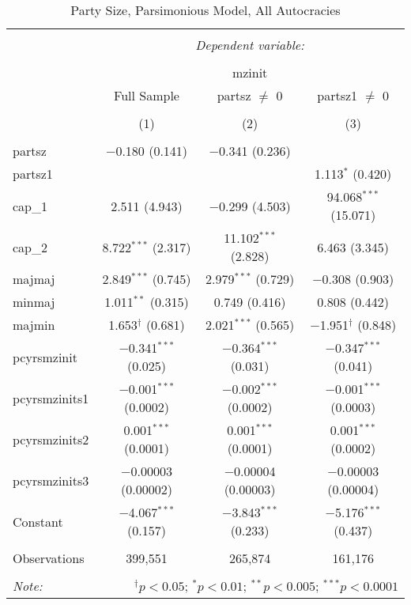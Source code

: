 
\begin{table}[!htbp] \centering 
  \caption{Party Size, Parsimonious Model, All Autocracies} 
  \label{} 
\begin{tabular}{@{\extracolsep{5pt}}lccc} 
\\[-1.8ex]\hline 
\hline \\[-1.8ex] 
 & \multicolumn{3}{c}{\textit{Dependent variable:}} \\ 
\cline{2-4} 
\\[-1.8ex] & \multicolumn{3}{c}{mzinit} \\ 
 & Full Sample & partsz $\neq$ 0 & partsz1 $\neq$ 0 \\ 
\\[-1.8ex] & (1) & (2) & (3)\\ 
\hline \\[-1.8ex] 
 partsz & $-$0.180 (0.141) & $-$0.341 (0.236) &  \\ 
  partsz1 &  &  & 1.113$^{*}$ (0.420) \\ 
  cap\_1 & 2.511 (4.943) & $-$0.299 (4.503) & 94.068$^{***}$ (15.071) \\ 
  cap\_2 & 8.722$^{***}$ (2.317) & 11.102$^{***}$ (2.828) & 6.463 (3.345) \\ 
  majmaj & 2.849$^{***}$ (0.745) & 2.979$^{***}$ (0.729) & $-$0.308 (0.903) \\ 
  minmaj & 1.011$^{**}$ (0.315) & 0.749 (0.416) & 0.808 (0.442) \\ 
  majmin & 1.653$^{\dagger}$ (0.681) & 2.021$^{***}$ (0.565) & $-$1.951$^{\dagger}$ (0.848) \\ 
  pcyrsmzinit & $-$0.341$^{***}$ (0.025) & $-$0.364$^{***}$ (0.031) & $-$0.347$^{***}$ (0.041) \\ 
  pcyrsmzinits1 & $-$0.001$^{***}$ (0.0002) & $-$0.002$^{***}$ (0.0002) & $-$0.001$^{***}$ (0.0003) \\ 
  pcyrsmzinits2 & 0.001$^{***}$ (0.0001) & 0.001$^{***}$ (0.0001) & 0.001$^{***}$ (0.0002) \\ 
  pcyrsmzinits3 & $-$0.00003 (0.00002) & $-$0.00004 (0.00003) & $-$0.00003 (0.00004) \\ 
  Constant & $-$4.067$^{***}$ (0.157) & $-$3.843$^{***}$ (0.233) & $-$5.176$^{***}$ (0.437) \\ 
 \hline \\[-1.8ex] 
Observations & 399,551 & 265,874 & 161,176 \\ 
\hline 
\hline \\[-1.8ex] 
\textit{Note:}  & \multicolumn{3}{r}{$^{\dagger} p<0.05$; $^{*} p<0.01$; $^{**} p<0.005$; $^{***} p<0.0001$} \\ 
\end{tabular} 
\end{table} 
